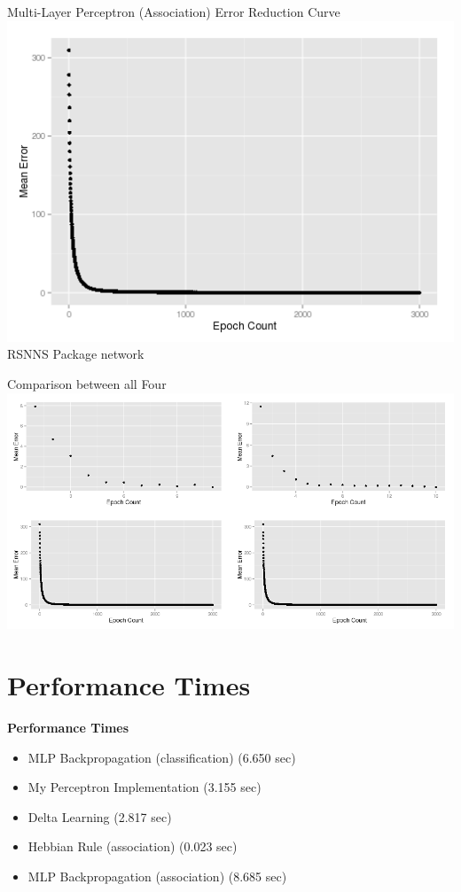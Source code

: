 \documentclass[xcolor=table]{beamer}
\begin{document}
\begin{frame}
 Multi-Layer Perceptron (Association) Error Reduction Curve\\
 \includegraphics[scale=0.4]{mplAssociation.png}
 RSNNS Package network
\end{frame}
\begin{frame}
 Comparison between all Four\\
 \includegraphics[scale=0.35]{all.png}
 
\end{frame}

\section{Performance Times}
\begin{frame}
\textbf{Performance Times}
\begin{itemize}
 \item MLP Backpropagation (classification) (6.650 sec)
 \item My Perceptron Implementation (3.155 sec)
 \item Delta Learning (2.817 sec)
 \item Hebbian Rule (association) (0.023 sec)
 \item MLP Backpropagation (association) (8.685 sec)
\end{itemize}

\end{frame}
\end{document}
